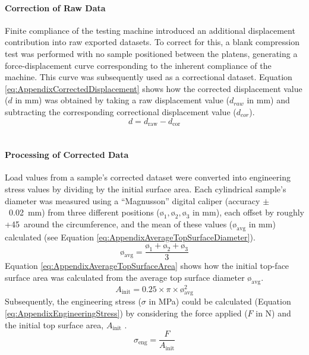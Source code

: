 \paragraph{Correction of Raw Data}
Finite compliance of the testing machine introduced an additional 
 displacement contribution into raw exported datasets.
To correct for this, a blank compression test was performed with no sample 
 positioned between the platens, generating a force-displacement curve 
 corresponding to the inherent compliance of the machine.
This curve was subsequently used as a correctional dataset.
Equation \ref{eq:AppendixCorrectedDisplacement} shows how the corrected displacement
 value (\(d\) in \unit{\milli\metre}) was obtained by taking a
 raw displacement value (\(d_{raw}\) in \unit{\milli\metre}) and
 subtracting the corresponding correctional displacement value
 (\(d_{cor}\)).
\begin{equation}\label{eq:AppendixCorrectedDisplacement}
    d = d_{\mathrm{raw}} - d_{\mathrm{cor}}
\end{equation}\

\paragraph{Processing of Corrected Data}
Load values from a sample's corrected dataset were converted into
 engineering stress values by dividing by the initial surface area.
Each cylindrical sample's diameter was measured using a ``Magnusson''
 digital caliper (accuracy \(\pm\)~0.02~\unit{\milli\metre}) from three
 different positions (\(\text{ø}_{1},\text{ø}_{2},\text{ø}_{3}\)
 in \unit{\milli\metre}), each offset by roughly +45\degree~around the
 circumference, and the mean of these values (\(\text{ø}_{\mathrm{avg}}\) in
 \unit{\milli\metre}) calculated (see Equation
 \ref{eq:AppendixAverageTopSurfaceDiameter}).
\begin{equation}\label{eq:AppendixAverageTopSurfaceDiameter}
    \text{ø}_{\mathrm{avg}} = \frac{\text{ø}_{1}+\text{ø}_{2}+\text{ø}_{3}}{3}
\end{equation}
Equation \ref{eq:AppendixAverageTopSurfaceArea} shows how the initial top-face
 surface area was calculated from the average top surface diameter
 \(\text{ø}_{\mathrm{avg}}\).
 \begin{equation}\label{eq:AppendixAverageTopSurfaceArea}
    A_{\mathrm{init}} = 0.25 \times \pi \times \text{ø}_{\mathrm{avg}}^{2}
\end{equation}
Subsequently, the engineering stress (\(\sigma\) in \unit{\mega\pascal}) could
 be calculated (Equation \ref{eq:AppendixEngineeringStress}) by considering the
 force applied (\(F\) in \unit{\newton}) and the initial top surface area,
 \(A_{\mathrm{init}}\) \autocite{Martin2006}.
\begin{equation}\label{eq:AppendixEngineeringStress}
    \sigma _{\mathrm{eng}} =\frac{F}{A_{\mathrm{init}}}
\end{equation}

